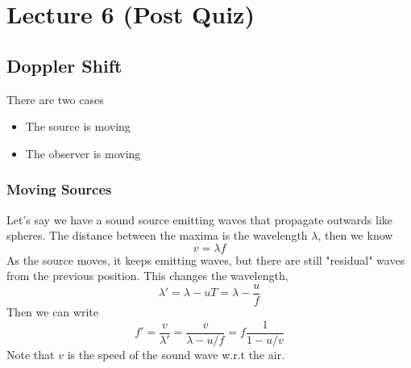 \documentclass{report}
\numberwithin{equation}{section}
\begin{document}
\section{Lecture 6 (Post Quiz)}
\subsection{Doppler Shift} There are two cases
\begin{itemize}
	\item The source is moving
	\item The observer is moving
\end{itemize}
\subsubsection{Moving Sources}
Let's say we have a sound source emitting waves that propagate outwards like spheres. The distance between the maxima is the wavelength $\lambda$, then we know
\begin{equation}
	v=\lambda f
\end{equation}
As the source moves, it keeps emitting waves, but there are still "residual" waves from the previous position. This changes the wavelength,
\begin{equation}
	\lambda' = \lambda - u T = \lambda -\frac{u}{f}
\end{equation}
Then we can write
\begin{equation}
	f' = \frac{v}{\lambda'} = \frac{v}{\lambda -u/f} = f\frac{1}{1-u/v}
\end{equation}
Note that $v$ is the speed of the sound wave w.r.t the air.
\end{document}

